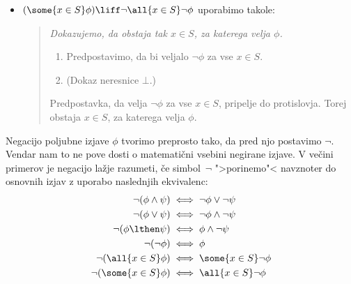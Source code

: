 \begin{itemize}
\begin{quote}
\begin{enumerate}
    \end{enumerate}
    Predpostavka, da obstaja $x \in S$, za katerega $\phi$ ne velja,
    pripelje do protislovja. Torej za vsak $x \in S$ velja $\phi$.
  \end{quote}
\item $(\some{x \in S} \phi) \liff \lnot \all{x \in S} \lnot \phi$
  uporabimo takole:
  \begin{quote}
    \it
    Dokazujemo, da obstaja tak $x \in S$, za katerega velja $\phi$.
    \begin{enumerate}
    \item Predpostavimo, da bi veljalo $\lnot\phi$ za vse $x \in S$.
    \item (Dokaz neresnice $\bot$.)
    \end{enumerate}
    Predpostavka, da velja $\lnot\phi$ za vse $x \in S$, pripelje do
    protislovja. Torej obstaja $x \in S$, za katerega velja $\phi$.
  \end{quote}
\end{itemize}

Negacijo poljubne izjave $\phi$ tvorimo preprosto tako, da pred njo
postavimo $\lnot$. Vendar nam to ne pove dosti o matematični vsebini
negirane izjave. V večini primerov je negacijo lažje razumeti, če
simbol~$\lnot$ ">porinemo"< navznoter do osnovnih izjav z uporabo
naslednjih ekvivalenc:
%
\begin{align*}
  \lnot (\phi \land \psi) &\iff \lnot\phi \lor \lnot\psi \\
  \lnot (\phi \lor \psi) &\iff \lnot\phi \land \lnot\psi \\
  \lnot (\phi \lthen \psi) &\iff \phi \land \lnot\psi \\
  \lnot (\lnot \phi) &\iff \phi \\
  \lnot (\all{x \in S} \phi) &\iff \some{x \in S} \lnot\phi \\
  \lnot (\some{x \in S} \phi) &\iff \all{x \in S} \lnot\phi
\end{align*}

